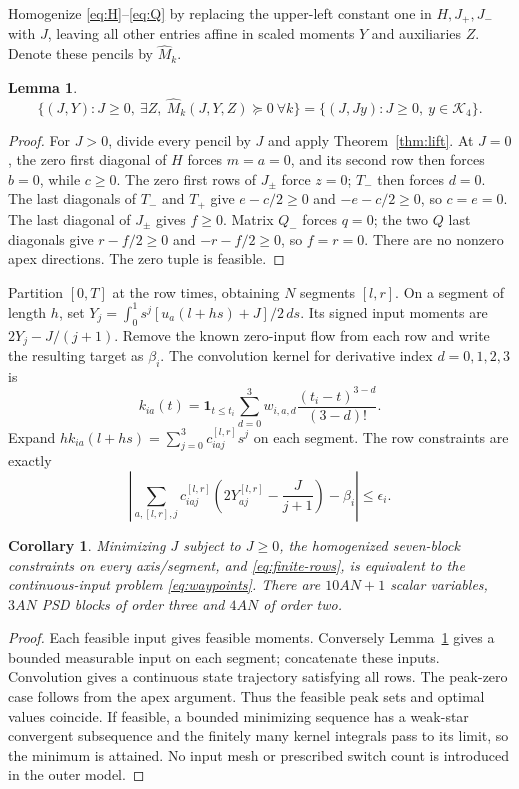 \documentclass[pdflatex,sn-mathphys-num]{sn-jnl}
\theoremstyle{thmstyleone}
\newtheorem{lemma}[theorem]{Lemma}
\newtheorem{corollary}[theorem]{Corollary}
\theoremstyle{thmstyletwo}\newtheorem{remark}[theorem]{Remark}
\newcommand{\K}{\mathcal K}
\begin{document}
Homogenize \eqref{eq:H}--\eqref{eq:Q} by replacing the upper-left constant
one in $H,J_+,J_-$ with $J$, leaving all other entries affine in scaled
moments $Y$ and auxiliaries $Z$. Denote these pencils by $\widehat M_k$.
\begin{lemma}\label{lem:homogeneous}
\[
 \{(J,Y):J\ge0,\ \exists Z,\ \widehat M_k(J,Y,Z)\succeq0\ \forall k\}
 =\{(J,Jy):J\ge0,\ y\in\K_4\}.
\]
\end{lemma}
\begin{proof}
For $J>0$, divide every pencil by $J$ and apply Theorem~\ref{thm:lift}.
At $J=0$, the zero first diagonal of $H$ forces $m=a=0$, and its second
row then forces $b=0$, while $c\ge0$. The zero first rows of $J_\pm$
force $z=0$; $T_-$ then forces $d=0$. The last diagonals of $T_-$ and
$T_+$ give $e-c/2\ge0$ and $-e-c/2\ge0$, so $c=e=0$.
The last diagonal of $J_\pm$ gives $f\ge0$. Matrix $Q_-$ forces $q=0$;
the two $Q$ last diagonals give $r-f/2\ge0$ and $-r-f/2\ge0$, so
$f=r=0$. There are no nonzero apex directions. The zero tuple is feasible.
\end{proof}

Partition $[0,T]$ at the row times, obtaining $N$ segments $[l,r]$.
On a segment of length $h$, set
$Y_j=\int_0^1 s^j[u_a(l+hs)+J]/2\,ds$.
Its signed input moments are $2Y_j-J/(j+1)$. Remove the known zero-input
flow from each row and write the resulting target as $\beta_i$.
The convolution kernel for derivative index $d=0,1,2,3$ is
\[
 k_{ia}(t)=\mathbf1_{t\le t_i}\sum_{d=0}^3
       w_{i,a,d}\frac{(t_i-t)^{3-d}}{(3-d)!}.
\]
Expand $h k_{ia}(l+hs)=\sum_{j=0}^3c_{iaj}^{[l,r]}s^j$ on each segment.
The row constraints are exactly
\begin{equation}\label{eq:finite-rows}
 \left|\sum_{a,[l,r],j}c_{iaj}^{[l,r]}
       \left(2Y_{aj}^{[l,r]}-\frac{J}{j+1}\right)-\beta_i\right|
       \le\epsilon_i.
\end{equation}

\begin{corollary}\label{cor:synthesis}
Minimizing $J$ subject to $J\ge0$, the homogenized seven-block constraints
on every axis/segment, and \eqref{eq:finite-rows}, is equivalent to the
continuous-input problem \eqref{eq:waypoints}. There are $10AN+1$ scalar
variables, $3AN$ PSD blocks of order three and $4AN$ of order two.
\end{corollary}
\begin{proof}
Each feasible input gives feasible moments. Conversely Lemma~\ref{lem:homogeneous}
gives a bounded measurable input on each segment; concatenate these inputs.
Convolution gives a continuous state trajectory satisfying all rows.
The peak-zero case follows from the apex argument. Thus the feasible peak
sets and optimal values coincide. If feasible, a bounded minimizing sequence
has a weak-star convergent subsequence and the finitely many kernel integrals
pass to its limit, so the minimum is attained. No input mesh or prescribed
switch count is introduced in the outer model.
\end{proof}
\end{document}

